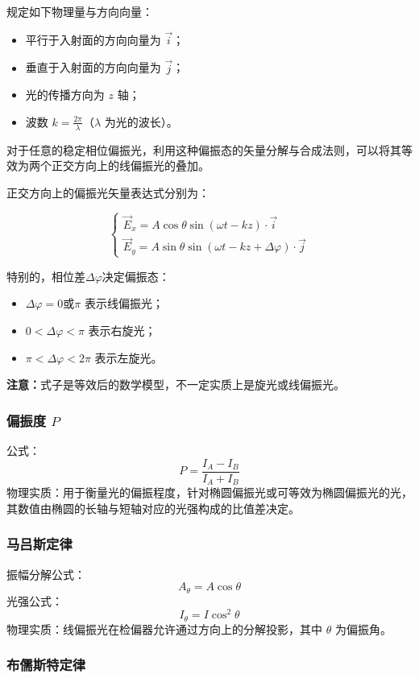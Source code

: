 \documentclass{article}
\begin{document}
	规定如下物理量与方向向量：
	\begin{itemize}[leftmargin=2em]
		\item 平行于入射面的方向向量为 $\vec{i}$；
		\item 垂直于入射面的方向向量为 $\vec{j}$；
		\item 光的传播方向为 $z$ 轴；
		\item 波数 $k=\frac{2\pi}{\lambda}$（$\lambda$ 为光的波长）。
	\end{itemize}
	
	对于任意的稳定相位偏振光，利用这种偏振态的矢量分解与合成法则，可以将其等效为两个正交方向上的线偏振光的叠加。
	
	正交方向上的偏振光矢量表达式分别为：

	
	\[
	\begin{cases}
		\vec{E}_x = A\cos\theta\sin(\omega t - kz)\cdot\vec{i}\\
	
		\vec{E}_y = A\sin\theta\sin(\omega t - kz+\Delta\varphi)\cdot\vec{j}
	\end{cases}
	\]
	
	
	
	特别的，相位差$\Delta\varphi$决定偏振态：
	\begin{itemize}[leftmargin=2em]
		\item $\Delta\varphi=0 \text{或} \pi $ 表示线偏振光；
		\item $0<\Delta\varphi < \pi$ 表示右旋光；
		\item $\pi < \Delta\varphi<2\pi$ 表示左旋光。
	\end{itemize}
	
	\textbf{注意：}式子是等效后的数学模型，不一定实质上是旋光或线偏振光。
	
	\subsubsection{偏振度 \(P\)}
	公式：
	\[
	P = \frac{I_A - I_B}{I_A + I_B}
	\]
	物理实质：用于衡量光的偏振程度，针对椭圆偏振光或可等效为椭圆偏振光的光，其数值由椭圆的长轴与短轴对应的光强构成的比值差决定。
	
	\subsubsection{马吕斯定律}
	振幅分解公式：
	\[
	A_\theta = A\cos\theta
	\]
	光强公式：
	\[
	I_\theta = I\cos^2\theta
	\]
	物理实质：线偏振光在检偏器允许通过方向上的分解投影，其中 \(\theta\) 为偏振角。
	
	\subsubsection{	布儒斯特定律}
\end{document}
